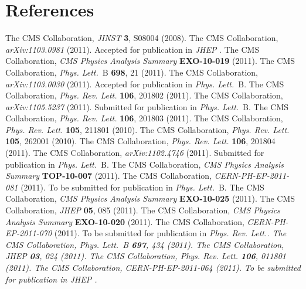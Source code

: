 \documentclass[11pt]{article}
\def\Journal#1#2#3#4{{#1} {\bf #2}, #3 (#4)}
\def\PLB{{\em Phys. Lett.}~B}
\def\PRL{\em Phys. Rev. Lett.}
\def\PRD{{\em Phys. Rev.}~D}
\def\JINST{{\em JINST} }
\def\JHEP{{\em JHEP} }
\begin{document}
\section*{References}
\begin{thebibliography}{99}

The CMS Collaboration, \Journal{\JINST}{3}{S08004}{2008}.
The CMS Collaboration, {\em arXiv:1103.0981} (2011). Accepted for publication in \JHEP.
The CMS Collaboration, {\em CMS Physics Analysis Summary} {\bf EXO-10-019} (2011).
The CMS Collaboration, \Journal{\PLB}{698}{21}{2011}.
The CMS Collaboration, {\em arXiv:1103.0030} (2011). Accepted for publication in \PLB.
The CMS Collaboration, \Journal{\PRL}{106}{201802}{2011}.
The CMS Collaboration, {\em arXiv:1105.5237} (2011). Submitted for publication in \PLB.
The CMS Collaboration, \Journal{\PRL}{106}{201803}{2011}.
The CMS Collaboration, \Journal{\PRL}{105}{211801}{2010}.
The CMS Collaboration, \Journal{\PRL}{105}{262001}{2010}.
The CMS Collaboration, \Journal{\PRL}{106}{201804}{2011}.
The CMS Collaboration, {\em arXiv:1102.4746} (2011). Submitted for publication in \PLB.
The CMS Collaboration, {\em CMS Physics Analysis Summary} {\bf TOP-10-007} (2011).
The CMS Collaboration, {\em CERN-PH-EP-2011-081} (2011). To be submitted for publication in \PLB.
The CMS Collaboration, {\em CMS Physics Analysis Summary} {\bf EXO-10-025} (2011).
The CMS Collaboration, \Journal{\JHEP}{05}{085}{2011}.
The CMS Collaboration, {\em CMS Physics Analysis Summary} {\bf EXO-10-020} (2011).
The CMS Collaboration, {\em CERN-PH-EP-2011-070} (2011). To be submitted for publication in \PRL.
The CMS Collaboration, \Journal{\PLB}{697}{434}{2011}.
The CMS Collaboration, \Journal{\JHEP}{03}{024}{2011}.
The CMS Collaboration, \Journal{\PRL}{106}{011801}{2011}.
The CMS Collaboration, {\em CERN-PH-EP-2011-064} (2011). To be submitted for publication in \JHEP.



\end{thebibliography}
\end{document}
